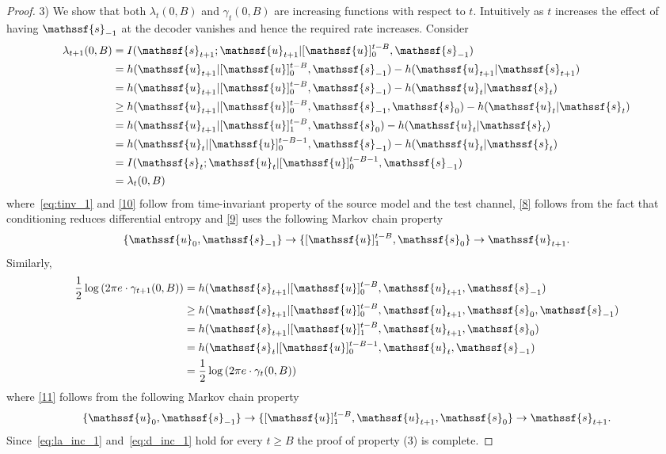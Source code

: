 \documentclass[journal, twocolumn, 10pt]{IEEEtran}
\newcommand{\rvs}{{\mathssf{s}}}    %
\newcommand{\rvu}{{\mathssf{u}}}    %
\begin{document}
\begin{proof}
3) We show that both $\lambda_t(0,B)$ and $\gamma_t(0,B)$ are increasing functions with respect to $t$. Intuitively as $t$ increases the effect of having $\rvs_{-1}$ at the decoder vanishes and hence the required rate increases.
 Consider 
\begin{align}
\lambda_{t+1}(0,B) &= I(\rvs_{t+1}; \rvu_{t+1} | [\rvu]_{0}^{t-B}, \rvs_{-1})\notag\\
& = h(\rvu_{t+1} | [\rvu]_{0}^{t-B}, \rvs_{-1}) - h(\rvu_{t+1} | \rvs_{t+1})\notag\\
&=  h(\rvu_{t+1} | [\rvu]_{0}^{t-B}, \rvs_{-1}) -  h(\rvu_{t} | \rvs_{t})\label{eq:tinv_1}\\
& \ge  h(\rvu_{t+1} | [\rvu]_{0}^{t-B}, \rvs_{-1}, \rvs_{0}) -  h(\rvu_{t} | \rvs_{t})\label{8}\\
& =   h(\rvu_{t+1} | [\rvu]_{1}^{t-B},  \rvs_{0}) -  h(\rvu_{t} | \rvs_{t})\label{9}\\
& =   h(\rvu_{t} | [\rvu]_{0}^{t-B-1},  \rvs_{-1}) -  h(\rvu_{t} | \rvs_{t})\label{10}\\
& =  I(\rvs_{t}; \rvu_{t} | [\rvu]_{0}^{t-B-1}, \rvs_{-1}) \notag\\
& = \lambda_t(0,B)\label{eq:la_inc_1}
\end{align} where~\eqref{eq:tinv_1} and \eqref{10} follow from time-invariant property of the source model and the test channel,
\eqref{8} follows from the fact that conditioning reduces differential entropy and \eqref{9} uses the following Markov chain property
\begin{align}
\{\rvu_{0}, \rvs_{-1}\}  \rightarrow  \{[\rvu]_{1}^{t-B}, \rvs_{0}\}  \rightarrow \rvu_{t+1}.
\end{align}
Similarly, 
\begin{align}
\frac{1}{2}\log\left(2\pi e \cdot\gamma_{t+1}(0,B)\right) &= h(\rvs_{t+1}| [\rvu]_{0}^{t-B}, \rvu_{t+1}, \rvs_{-1}) \notag\\
&\ge h(\rvs_{t+1}| [\rvu]_{0}^{t-B}, \rvu_{t+1}, \rvs_{0},\rvs_{-1}) \notag\\
&= h(\rvs_{t+1}| [\rvu]_{1}^{t-B}, \rvu_{t+1}, \rvs_{0}) \label{11}\\
& = h(\rvs_{t}| [\rvu]_{0}^{t-B-1}, \rvu_{t}, \rvs_{-1})\notag\\
& =\frac{1}{2}\log\left(2\pi e \cdot\gamma_t(0,B)\right)\label{eq:d_inc_1}
\end{align} where \eqref{11} follows from the following Markov chain property
 \begin{align}
\{\rvu_{0}, \rvs_{-1}\}  \rightarrow  \{[\rvu]_{1}^{t-B}, \rvu_{t+1}, \rvs_{0}\}  \rightarrow \rvs_{t+1}.
\end{align} 
Since~\eqref{eq:la_inc_1} and~\eqref{eq:d_inc_1} hold for every $t \ge B$ the proof of property (3) is complete.


\end{proof}
\end{document}
